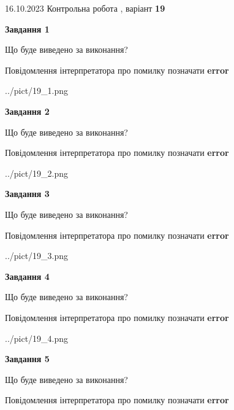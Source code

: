 \documentclass[12pt, ukrainian]{article}
\begin{document}
{\Large{16.10.2023 Контрольна робота , варіант  \No \textbf { 19 }\par}}
{
\begin {large}
{\begin {center}\textbf{Завдання 1}\end {center}}\par
Що буде виведено за виконання? \par
Повідомлення інтерпретатора про помилку позначати \textbf{error}

\begin{center}
	{../pict/19_1.png}
\end{center}
\newpage

{\begin {center}\textbf{Завдання 2}\end {center}}\par
Що буде виведено за виконання? \par
Повідомлення інтерпретатора про помилку позначати \textbf{error}

\begin{center}
	{../pict/19_2.png}
\end{center}
\newpage

{\begin {center}\textbf{Завдання 3}\end {center}}\par
Що буде виведено за виконання? \par
Повідомлення інтерпретатора про помилку позначати \textbf{error}

\begin{center}
	{../pict/19_3.png}
\end{center}
\newpage

{\begin {center}\textbf{Завдання 4}\end {center}}\par
Що буде виведено за виконання? \par
Повідомлення інтерпретатора про помилку позначати \textbf{error}

\begin{center}
	{../pict/19_4.png}
\end{center}
\newpage

{\begin {center}\textbf{Завдання 5}\end {center}}\par
Що буде виведено за виконання? \par
Повідомлення інтерпретатора про помилку позначати \textbf{error}


\end{large}}
\end{document}
